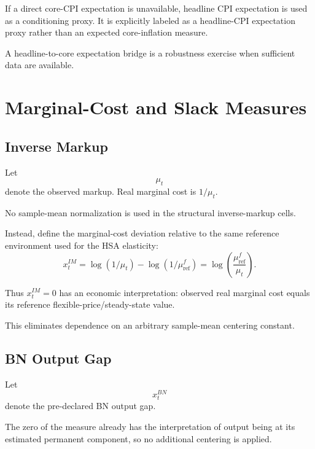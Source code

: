 \documentclass[11pt]{article}
\begin{document}
If a direct core-CPI expectation is unavailable, headline CPI expectation is used as a conditioning proxy. It is explicitly labeled as a headline-CPI expectation proxy rather than an expected core-inflation measure.

A headline-to-core expectation bridge is a robustness exercise when sufficient data are available.

\section{Marginal-Cost and Slack Measures}

\subsection{Inverse Markup}

Let
\begin{equation}
\mu_t
\end{equation}
denote the observed markup. Real marginal cost is \(1/\mu_t\).

No sample-mean normalization is used in the structural inverse-markup cells.

Instead, define the marginal-cost deviation relative to the same reference environment used for the HSA elasticity:
\begin{equation}
\boxed{
x_t^{IM}
=
\log(1/\mu_t)
-
\log(1/\mu_{\mathrm{ref}}^f)
=
\log
\left(
\frac{\mu_{\mathrm{ref}}^f}{\mu_t}
\right).
}
\label{eq:inverse_markup_gap}
\end{equation}

Thus \(x_t^{IM}=0\) has an economic interpretation: observed real marginal cost equals its reference flexible-price/steady-state value.

This eliminates dependence on an arbitrary sample-mean centering constant.

\subsection{BN Output Gap}

Let
\begin{equation}
x_t^{BN}
\end{equation}
denote the pre-declared BN output gap.

The zero of the measure already has the interpretation of output being at its estimated permanent component, so no additional centering is applied.
\end{document}
